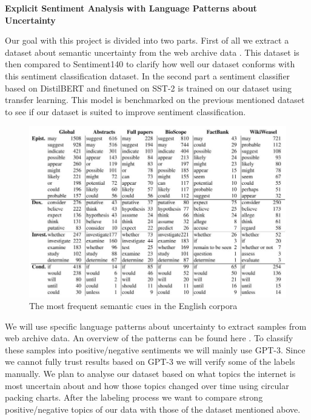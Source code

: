 \documentclass[a4paper,12pt,numbers=enddot]{scrartcl}
\begin{document}
\singlespacing

\begin{Large}
\begin{center}
\textbf{Explicit Sentiment Analysis with Language Patterns about Uncertainty}
\end{center}
\end{Large}

Our goal with this project is divided into two parts. First of all we extract a dataset about semantic uncertainty from the web archive data \citep{Kiesel2018}. This dataset is then compared to Sentiment140 \citep{Sent140} to clarify how well our dataset conforms with this sentiment classification dataset. In the second part a sentiment classifier based on DistilBERT and finetuned on SST-2 \citep{DistilBert} is trained on our dataset using transfer learning. This model is benchmarked on the previous mentioned dataset to see if our dataset is suited to improve sentiment classification.
\begin{figure}[htb]
	\centering
	\includegraphics[scale=0.55]{language_patterns.png}
	\caption{The most frequent semantic cues in the English corpora \citep{vincze2014uncertainty}}
\end{figure}

We will use specific language patterns about uncertainty to extract samples from web archive data. An overview of the patterns can be found here \citep[p. 43]{vincze2014uncertainty}. To classify these samples into positive/negative sentiments we will mainly use GPT-3. Since we cannot fully trust results based on GPT-3 we will verify some of the labels manually. We plan to analyse our dataset based on what topics the internet is most uncertain about and how those topics changed over time using circular packing charts. After the labeling process we want to compare strong positive/negative topics of our data with those of the dataset mentioned above.
\\
\end{document}
